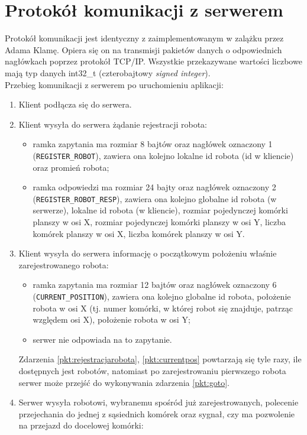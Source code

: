 \section{Protokół komunikacji z serwerem}
Protokół komunikacji jest identyczny z zaimplementowanym w zalążku przez Adama Klamę. Opiera się on na transmisji pakietów danych o odpowiednich nagłówkach poprzez protokół TCP/IP. Wszystkie przekazywane wartości liczbowe mają typ danych int32\_t (czterobajtowy \textit{signed integer}).\\

Przebieg komunikacji z serwerem po uruchomieniu aplikacji:
\begin{enumerate}
\item Klient podłącza się do serwera.
\item\label{pkt:rejestracjarobota} Klient wysyła do serwera żądanie rejestracji robota:
\begin{itemize}
\item ramka zapytania ma rozmiar 8 bajtów oraz nagłówek oznaczony 1 (\texttt{REGISTER\_ROBOT}), zawiera ona kolejno lokalne id robota (id w kliencie) oraz promień robota;
\item ramka odpowiedzi ma rozmiar 24 bajty oraz nagłówek oznaczony 2 (\texttt{REGISTER\_ROBOT\_RESP}), zawiera ona kolejno globalne id robota (w serwerze), lokalne id robota (w kliencie), rozmiar pojedynczej komórki planszy w osi X, rozmiar pojedynczej komórki planszy w osi Y, liczba komórek planszy w osi X, liczba komórek planszy w osi Y.
\end{itemize}
\item\label{pkt:currentpos} Klient wysyła do serwera informację o początkowym położeniu właśnie zarejestrowanego robota:
\begin{itemize}
\item ramka zapytania ma rozmiar 12 bajtów oraz nagłówek oznaczony 6 (\texttt{CURRENT\_POSITION}), zawiera ona kolejno globalne id robota, położenie robota w osi X (tj. numer komórki, w której robot się znajduje, patrząc względem osi X), położenie robota w osi Y;
\item serwer nie odpowiada na to zapytanie.
\end{itemize}
\vspace{10pt}
Zdarzenia \ref{pkt:rejestracjarobota}, \ref{pkt:currentpos} powtarzają się tyle razy, ile dostępnych jest robotów, natomiast po zarejestrowaniu pierwszego robota serwer może przejść do wykonywania zdarzenia \ref{pkt:goto}.
\vspace{10pt}
\item\label{pkt:goto} Serwer wysyła robotowi, wybranemu spośród już zarejestrowanych, polecenie przejechania do jednej z sąsiednich komórek oraz sygnał, czy ma pozwolenie na przejazd do docelowej komórki:

\end{enumerate}
